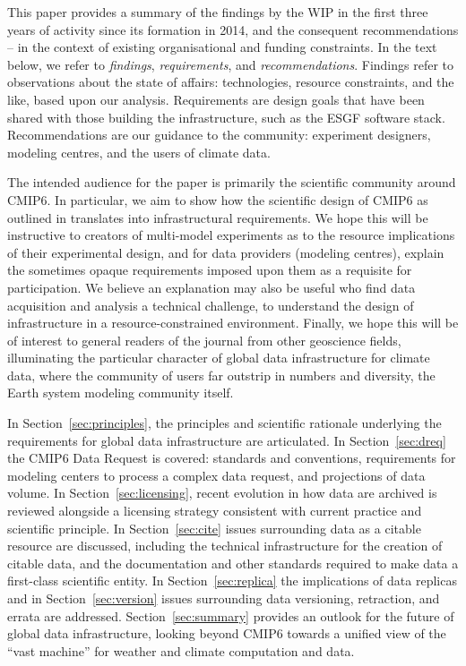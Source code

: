 \documentclass[gmd,manuscript]{copernicus}
\newcommand{\pllabel}[1]{\label{p-#1}\linelabel{l-#1}}
\begin{document}
This paper provides a summary of the
\pllabel{RC1-Overview-1}
findings by the WIP in the first three years of activity since its
formation in 2014, and the consequent recommendations -- in the
context of existing organisational and funding constraints. In the
text below, we refer to \emph{findings}, \emph{requirements}, and
\emph{recommendations}. Findings refer to observations about the state
of affairs: technologies, resource constraints, and the like, based
upon our analysis. Requirements are design goals that have been shared
with those building the infrastructure, such as the ESGF software
stack. Recommendations are our guidance to the community: experiment
designers, modeling centres, and the users of climate data.

\pllabel{RC1-Overview-1}
The intended audience for the paper is primarily the scientific
community around CMIP6. In particular, we aim to show how the
scientific design of CMIP6 as outlined in \cite{ref:eyringetal2016a}
translates into infrastructural requirements. We hope this will be
instructive to creators of multi-model experiments as to the resource
implications of their experimental design, and for data providers
(modeling centres), explain the sometimes opaque requirements imposed
upon them as a requisite for participation. We believe an explanation
may also be useful who find data acquisition and analysis a technical
challenge, to understand the design of infrastructure in a
resource-constrained environment. Finally, we hope this will be of
interest to general readers of the journal from other geoscience
fields, illuminating the particular character of global data
infrastructure for climate data, where the community of users far
outstrip in numbers and diversity, the Earth system modeling community
itself.

In Section~\ref{sec:principles}, the principles and scientific
rationale underlying the requirements for global data infrastructure
are articulated. In Section~\ref{sec:dreq} the CMIP6 Data Request is
covered: standards and conventions, requirements for modeling centers
to process a complex data request, and projections of data volume. In
Section~\ref{sec:licensing}, recent evolution in how data are archived
is reviewed alongside a licensing strategy consistent with current
practice and scientific principle. In Section~\ref{sec:cite} issues
surrounding data as a citable resource are discussed, including the
technical infrastructure for the creation of citable data, and the
documentation and other standards required to make data a first-class
scientific entity. In Section~\ref{sec:replica} the implications of
data replicas and in Section~\ref{sec:version} issues surrounding data
versioning, retraction, and errata are addressed.
Section~\ref{sec:summary} provides an outlook for the future of global
data infrastructure, looking beyond CMIP6 towards a unified view of
the ``vast machine'' for weather and climate computation and data.
\end{document}
